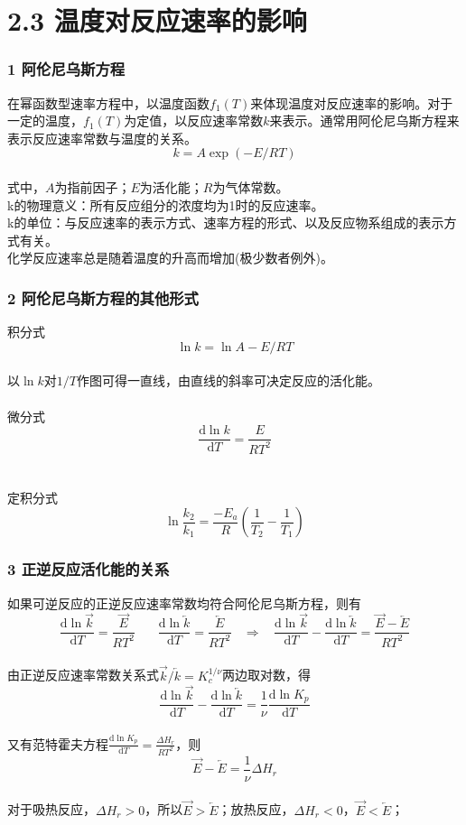 
\section{2.3 温度对反应速率的影响}
\begin{frame}
	\frametitle{1 阿伦尼乌斯方程}
        在幂函数型速率方程中，以温度函数$f_1(T)$来体现温度对反应速率的影响。对于一定的温度，$f_1(T)$为定值，以反应速率常数$k$来表示。通常用阿伦尼乌斯方程来表示反应速率常数与温度的关系。
    $$k = A\exp(-E/RT) $$\\
    式中，$A$为指前因子；$E$为活化能；$R$为气体常数。
    \\k的物理意义：所有反应组分的浓度均为1时的反应速率。
    \\k的单位：与反应速率的表示方式、速率方程的形式、以及反应物系组成的表示方式有关。
        \\化学反应速率总是随着温度的升高而增加(极少数者例外)。
\end{frame}


\begin{frame}
	\frametitle{2 阿伦尼乌斯方程的其他形式}
	积分式
	$$\ln{k}=\ln{A}-E/RT$$\\
	以$\ln{k}$对$1/T$作图可得一直线，由直线的斜率可决定反应的活化能。
	\\~
	\\微分式
	$$\frac{\mathrm{d}\ln{k}}{\mathrm{d}T} =\frac{E}{RT^2}$$
	\\~
	\\定积分式
	$$\ln\frac{k_2}{k_1}=\frac{-E_a}{R}(\frac{1}{T_2}-\frac{1}{T_1})$$	
\end{frame}


\begin{frame}
	\frametitle{3 正逆反应活化能的关系}
	如果可逆反应的正逆反应速率常数均符合阿伦尼乌斯方程，则有
	$$\frac{\mathrm{d}\ln\overrightarrow{k}}{\mathrm{d}T} =\frac{\overrightarrow{E}}{RT^2}~~~~~~~~
	\frac{\mathrm{d}\ln\overleftarrow{k}}{\mathrm{d}T} =\frac{\overleftarrow{E}}{RT^2}~~~~\Rightarrow ~~~~\frac{\mathrm{d}\ln\overrightarrow{k}}{\mathrm{d}T}-\frac{\mathrm{d}\ln\overleftarrow{k}}{\mathrm{d}T}=\frac{\overrightarrow{E}-\overleftarrow{E}}{RT^2}$$
	\\由正逆反应速率常数关系式$\overrightarrow{k}/\overleftarrow{k}=K_c^{1/\nu}$两边取对数，得
	$$\frac{\mathrm{d}\ln\overrightarrow{k}}{\mathrm{d}T}-\frac{\mathrm{d}\ln\overleftarrow{k}}{\mathrm{d}T}=\frac{1}{\nu}\frac{\mathrm{d}\ln{K_p}}{\mathrm{d}T}$$
	\\又有范特霍夫方程$\frac{\mathrm{d}\ln{K_p}}{\mathrm{d}T}=\frac{\Delta{H_r}}{RT^2}$，则
	$$\overrightarrow{E}-\overleftarrow{E}=\frac{1}{\nu}\Delta{H_r}$$
	\\对于吸热反应，$\Delta{H_r}>0$，所以$\overrightarrow{E}>\overleftarrow{E}$；放热反应，$\Delta{H_r}<0$，$\overrightarrow{E}<\overleftarrow{E}$；
\end{frame}


